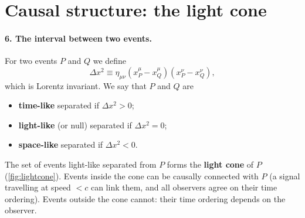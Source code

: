 \section{Causal structure: the light cone}

\paragraph{6. The interval between two events.} For two events $P$ and $Q$ we define
\begin{equation}
  \Delta x^2\equiv\eta_{\mu\nu}(x_P^\mu-x_Q^\mu)(x_P^\nu-x_Q^\nu),
\end{equation}
which is Lorentz invariant. We say that $P$ and $Q$ are
\begin{itemize}[nosep]
  \item \textbf{time-like} separated if $\Delta x^2>0$;
  \item \textbf{light-like} (or null) separated if $\Delta x^2=0$;
  \item \textbf{space-like} separated if $\Delta x^2<0$.
\end{itemize}
The set of events light-like separated from $P$ forms the \textbf{light cone} of $P$ (\cref{fig:lightcone}). Events inside the cone can be causally connected with $P$ (a signal travelling at speed $<c$ can link them, and all observers agree on their time ordering). Events outside the cone cannot: their time ordering depends on the observer.

